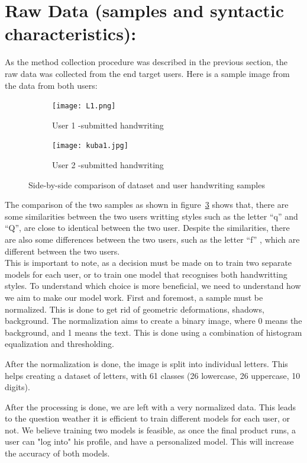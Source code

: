 \documentclass[twoside,a4paper]{article}
\begin{document}
\section{Raw Data (samples and syntactic characteristics): }
As the method collection procedure was described in the previous section, the raw data was collected from the end target users.
Here is a sample image from the data from both users:
\begin{figure}[H]
  \centering

  \begin{subfigure}[b]{0.45\textwidth}
    \centering
    \texttt{[image: L1.png]}
    \caption{User 1 -submitted handwriting }
    \label{fig:l1_sample}
  \end{subfigure}
  \hfill
  \begin{subfigure}[b]{0.45\textwidth}
    \centering
    \texttt{[image: kuba1.jpg]}
    \caption{User 2 -submitted handwriting }
    \label{fig:kuba_sample}
  \end{subfigure}

  \caption{Side-by-side comparison of dataset and user handwriting samples}
  \label{fig:raw_data_sample}
\end{figure}
The comparison of the two samples as shown in figure~\ref{fig:raw_data_sample} shows that, there are some similarities between the two users writting styles
such as the letter ``q'' and ``Q'', are close to identical between the two user. Despite the similarities, there are also some differences between the two users, such as the letter ``f'' , which are different between the two users.
\\
This is important to note, as a decision must be made on to train two separate models for each user, or to train one model that recognises both handwritting styles.
To understand which choice is more beneficial, we need to understand how we aim to make our model work. First and foremost, a sample must be normalized. This is done to get rid of geometric deformations,
shadows, background. The normalization aims to create a binary image, where 0 means the background, and 1 means the text. This is done using a combination of histogram equalization and thresholding.

After the normalization is done, the image is split into individual letters. This helps creating a dataset of letters, with 61 classes (26 lowercase, 26 uppercase, 10 digits).

After the processing is done, we are left with a very normalized data. This leads to the question weather it is efficient to train different models for each user, or not. 
We believe training two models is feasible, as once the final product runs, a user can "log into" his profile, and have a personalized model. This will increase the accuracy of both models.
\end{document}
